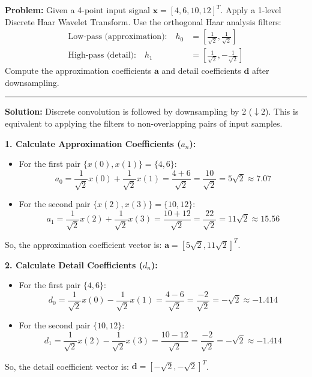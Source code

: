 \documentclass[12pt,a4paper]{article}
\begin{document}
\begin{tcolorbox}[examplebox, title={1D Haar Wavelet Transform}]
\textbf{Problem:} Given a 4-point input signal $\mathbf{x} = [4, 6, 10, 12]^T$. Apply a 1-level Discrete Haar Wavelet Transform. Use the orthogonal Haar analysis filters:
\begin{align*}
  \text{Low-pass (approximation):} \quad h_0 &= \left[ \frac{1}{\sqrt{2}}, \frac{1}{\sqrt{2}} \right] \\[4pt]
  \text{High-pass (detail):} \quad h_1 &= \left[ \frac{1}{\sqrt{2}}, -\frac{1}{\sqrt{2}} \right]
\end{align*}
Compute the approximation coefficients $\mathbf{a}$ and detail coefficients $\mathbf{d}$ after downsampling.

\par\noindent\rule{\linewidth}{0.5pt}\par
\textbf{Solution:}
Discrete convolution is followed by downsampling by 2 ($\downarrow 2$). This is equivalent to applying the filters to non-overlapping pairs of input samples.

\textbf{1. Calculate Approximation Coefficients ($a_n$):}
\begin{itemize}[leftmargin=1.5em, itemsep=2.5pt]
  \item For the first pair $\{x(0), x(1)\} = \{4, 6\}$:
    \begin{equation*}
      a_0 = \frac{1}{\sqrt{2}}x(0) + \frac{1}{\sqrt{2}}x(1) = \frac{4 + 6}{\sqrt{2}} = \frac{10}{\sqrt{2}} = 5\sqrt{2} \approx 7.07
    \end{equation*}
  \item For the second pair $\{x(2), x(3)\} = \{10, 12\}$:
    \begin{equation*}
      a_1 = \frac{1}{\sqrt{2}}x(2) + \frac{1}{\sqrt{2}}x(3) = \frac{10 + 12}{\sqrt{2}} = \frac{22}{\sqrt{2}} = 11\sqrt{2} \approx 15.56
    \end{equation*}
\end{itemize}
So, the approximation coefficient vector is: $\mathbf{a} = [5\sqrt{2}, 11\sqrt{2}]^T$.

\textbf{2. Calculate Detail Coefficients ($d_n$):}
\begin{itemize}[leftmargin=1.5em, itemsep=2.5pt]
  \item For the first pair $\{4, 6\}$:
    \begin{equation*}
      d_0 = \frac{1}{\sqrt{2}}x(0) - \frac{1}{\sqrt{2}}x(1) = \frac{4 - 6}{\sqrt{2}} = \frac{-2}{\sqrt{2}} = -\sqrt{2} \approx -1.414
    \end{equation*}
  \item For the second pair $\{10, 12\}$:
    \begin{equation*}
      d_1 = \frac{1}{\sqrt{2}}x(2) - \frac{1}{\sqrt{2}}x(3) = \frac{10 - 12}{\sqrt{2}} = \frac{-2}{\sqrt{2}} = -\sqrt{2} \approx -1.414
    \end{equation*}
\end{itemize}
So, the detail coefficient vector is: $\mathbf{d} = [-\sqrt{2}, -\sqrt{2}]^T$.


\end{tcolorbox}
\end{document}
